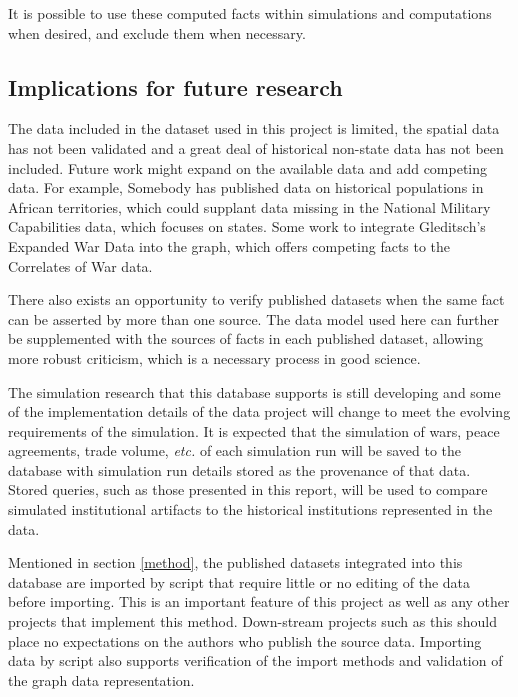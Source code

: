 \documentclass[runningheads]{llncs}
\begin{document}
It is possible to use these computed facts within simulations and computations when desired, and exclude them when necessary.

\subsection{Implications for future research}
The data included in the dataset used in this project is limited, the spatial data has not been validated and a great deal of historical non-state data has not been included. 
Future work might expand on the available data and add competing data.
For example, Somebody \cite{missing} has published data on historical populations in African territories, which could supplant data missing in the National Military Capabilities data, which focuses on states.
Some work to integrate Gleditsch's Expanded War Data into the graph, which offers competing facts to the Correlates of War data.

There also exists an opportunity to verify published datasets when the same fact can be asserted by more than one source.
The data model used here can further be supplemented with the sources of facts in each published dataset, allowing more robust criticism, which is a necessary process in good science. 

The simulation research that this database supports is still developing and some of the implementation details of the data project will change to meet the evolving requirements of the simulation.
It is expected that the simulation of wars, peace agreements, trade volume, \textit{etc.} of each simulation run will be saved to the database with simulation run details stored as the provenance of that data.
Stored queries, such as those presented in this report, will be used to compare simulated institutional artifacts to the historical institutions represented in the data.

Mentioned in section \ref{method}, the published datasets integrated into this database are imported by script that require little or no editing of the data before importing. 
This is an important feature of this project as well as any other projects that implement this method.
Down-stream projects such as this should place no expectations on the authors who publish the source data.
Importing data by script also supports verification of the import methods and validation of the graph data representation.
\end{document}
